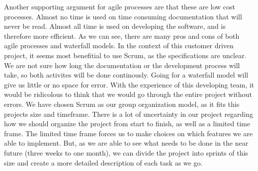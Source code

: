 \newline
\newline
Another supporting argument for agile processes are that these are low cost processes. Almost no time is used on time consuming documentation that will never be read. Almost all time is used on developing the software, and is therefore more efficient. 
\newline
\newline
As we can see, there are many pros and cons of both agile processes and waterfall models. In the context of this customer driven project, it seems most benefitial to use Scrum, as the specifications are unclear. We are not sure how long the documentation or the development process will take, so both activites will be done continously. Going for a waterfall model will give us little or no space for error. With the experience of this developing team, it would be ridicolous to think that we would go through the entire project without errors. 
\newline
\newline
We have chosen Scrum as our group organization model, as it fits this projects size and timeframe. There is a lot of uncertainty in our project regarding how we should organize the project from start to finish, as well as a limited time frame. The limited time frame forces us to make choices on which features we are able to implement.  But, as we are able to see what needs to be done in the near future (three weeks to one month), we can divide the project into sprints of this size and create a more detailed description of each task as we go.
